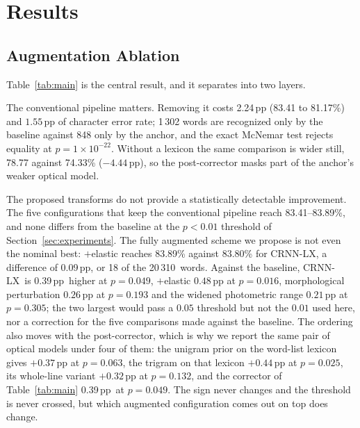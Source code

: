 \documentclass{ws-ijprai}
\newcommand{\ours}{CRNN-LX}            %
\newcommand{\deltawa}{0.39\,pp}        %
\newcommand{\anchordelta}{2.24}        %
\newcommand{\nsamples}{20\,310}
\begin{document}
\section{Results}
\label{sec:results}

\subsection{Augmentation Ablation}
\label{sec:res-aug}

Table~\ref{tab:main} is the central result, and it separates into two
layers.

The conventional pipeline matters. Removing it costs \anchordelta\,pp
(83.41 to 81.17\%) and $1.55$\,pp of character error rate; 1\,302
words are recognized only by the baseline against 848 only by the
anchor, and the exact McNemar test rejects equality at
$p=1\times10^{-22}$. Without a lexicon the same comparison is wider
still, 78.77 against 74.33\% ($-4.44$\,pp), so the post-corrector masks
part of the anchor's weaker optical model.

The proposed transforms do not provide a statistically detectable
improvement. The five configurations that keep the conventional pipeline
reach 83.41--83.89\%, and none differs from the baseline at the $p<0.01$
threshold of Section~\ref{sec:experiments}. The fully augmented scheme we
propose is not even the nominal best: $+$elastic reaches 83.89\% against
83.80\% for \ours, a difference of 0.09\,pp, or 18 of the \nsamples\
words. Against the baseline, \ours\ is \deltawa\ higher at $p=0.049$,
$+$elastic $0.48$\,pp at $p=0.016$, morphological perturbation
$0.26$\,pp at $p=0.193$ and the widened photometric range $0.21$\,pp at
$p=0.305$; the two largest would pass a $0.05$ threshold but not the
$0.01$ used here, nor a correction for the five comparisons made against
the baseline. The ordering also moves with the post-corrector, which is
why we report the same pair of optical models under four of them: the
unigram prior on the word-list lexicon gives $+0.37$\,pp at $p=0.063$,
the trigram on that lexicon $+0.44$\,pp at $p=0.025$, its whole-line
variant $+0.32$\,pp at $p=0.132$, and the corrector of
Table~\ref{tab:main} \deltawa\ at $p=0.049$. The sign never changes and
the threshold is never crossed, but which augmented configuration comes
out on top does change.
\end{document}
